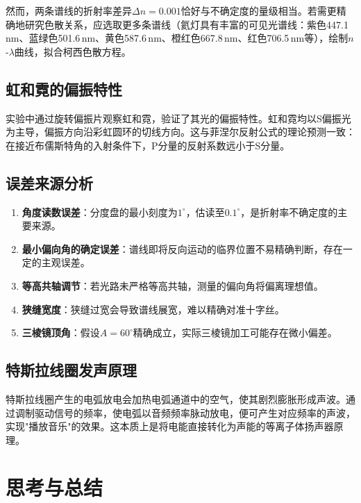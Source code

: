 \documentclass[UTF8]{article}
\begin{document}
然而，两条谱线的折射率差异$\Delta n = 0.001$恰好与不确定度的量级相当。若需更精确地研究色散关系，应选取更多条谱线（氦灯具有丰富的可见光谱线：紫色447.1\,nm、蓝绿色501.6\,nm、黄色587.6\,nm、橙红色667.8\,nm、红色706.5\,nm等），绘制$n$-$\lambda$曲线，拟合柯西色散方程。

\subsection{虹和霓的偏振特性}

实验中通过旋转偏振片观察虹和霓，验证了其光的偏振特性。虹和霓均以S偏振光为主导，偏振方向沿彩虹圆环的切线方向。这与菲涅尔反射公式的理论预测一致：在接近布儒斯特角的入射条件下，P分量的反射系数远小于S分量。

\subsection{误差来源分析}

\begin{enumerate}
    \item \textbf{角度读数误差}：分度盘的最小刻度为$1^\circ$，估读至$0.1^\circ$，是折射率不确定度的主要来源。
    \item \textbf{最小偏向角的确定误差}：谱线即将反向运动的临界位置不易精确判断，存在一定的主观误差。
    \item \textbf{等高共轴调节}：若光路未严格等高共轴，测量的偏向角将偏离理想值。
    \item \textbf{狭缝宽度}：狭缝过宽会导致谱线展宽，难以精确对准十字丝。
    \item \textbf{三棱镜顶角}：假设$A = 60^\circ$精确成立，实际三棱镜加工可能存在微小偏差。
\end{enumerate}

\subsection{特斯拉线圈发声原理}

特斯拉线圈产生的电弧放电会加热电弧通道中的空气，使其剧烈膨胀形成声波。通过调制驱动信号的频率，使电弧以音频频率脉动放电，便可产生对应频率的声波，实现"播放音乐"的效果。这本质上是将电能直接转化为声能的等离子体扬声器原理。

\section{思考与总结}
\end{document}
